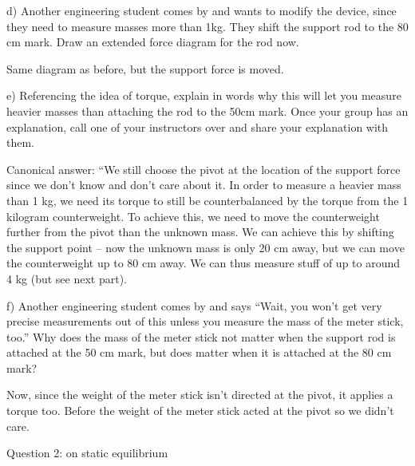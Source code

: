 \documentclass[12pt]{article}
\begin{document}
\vspace{2in}

d) Another engineering student comes by and wants to modify the device, since they need to measure masses more than 1kg. They shift the support rod to the 80 cm mark. Draw an extended force diagram for the rod now.


{\color{red} Same diagram as before, but the support force is moved.}

\vspace{2in}

e) Referencing the idea of torque, explain in words why this will let you measure heavier masses than attaching the rod to the 50cm mark. Once your group has an explanation, call one of your instructors over and share your explanation with them.

{\color{red} Canonical answer: ``We still choose the pivot at the location of the support force since we don't know and don't care about it. In order to measure a heavier mass than 1 kg, we need its torque to still be counterbalanced by the torque from the 1 kilogram counterweight. To achieve this, we need to move the counterweight further from the pivot than the unknown mass. We can achieve this by shifting the support point -- now the unknown mass is only 20 cm away, but we can move the counterweight up to 80 cm away. We can thus measure stuff of up to around 4 kg (but see next part).}

\vspace{1.5in}

f) Another engineering student comes by and says ``Wait, you won't get very precise measurements out of this unless you measure the mass of the meter stick, too.'' Why does the mass of the meter stick not matter when the support rod is attached at the 50 cm mark, but does matter when it is attached at the 80 cm mark?

{\color{red} Now, since the weight of the meter stick isn't directed at the pivot, it applies a torque too. Before the weight of the meter stick acted at the pivot so we didn't care.}


\newpage


\centerline{\large Question 2: on static equilibrium}
\end{document}
